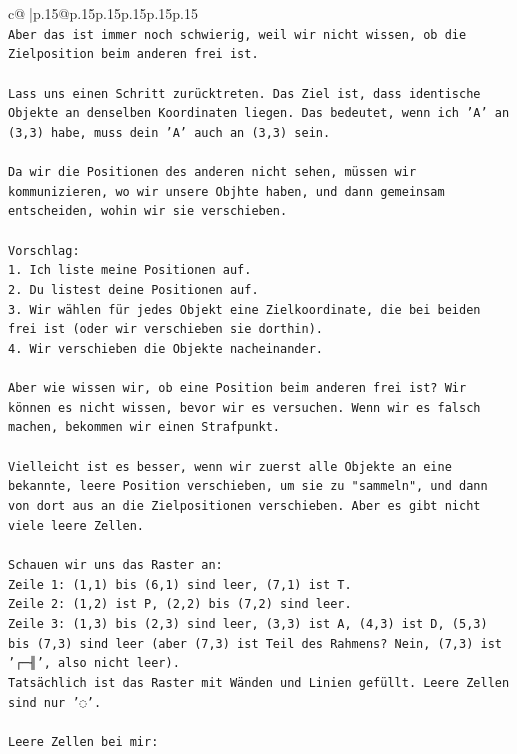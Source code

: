\documentclass{article}
\begin{document}
{\begin{supertabular}{c@{$\;$}|p{.15\linewidth}@{}p{.15\linewidth}p{.15\linewidth}p{.15\linewidth}p{.15\linewidth}p{.15\linewidth}}
{{{\\ 
\texttt{Aber das ist immer noch schwierig, weil wir nicht wissen, ob die Zielposition beim anderen frei ist.} \\
\\ 
\texttt{Lass uns einen Schritt zurücktreten. Das Ziel ist, dass identische Objekte an denselben Koordinaten liegen. Das bedeutet, wenn ich 'A' an (3,3) habe, muss dein 'A' auch an (3,3) sein.} \\
\\ 
\texttt{Da wir die Positionen des anderen nicht sehen, müssen wir kommunizieren, wo wir unsere Objhte haben, und dann gemeinsam entscheiden, wohin wir sie verschieben.} \\
\\ 
\texttt{Vorschlag:} \\
\texttt{1. Ich liste meine Positionen auf.} \\
\texttt{2. Du listest deine Positionen auf.} \\
\texttt{3. Wir wählen für jedes Objekt eine Zielkoordinate, die bei beiden frei ist (oder wir verschieben sie dorthin).} \\
\texttt{4. Wir verschieben die Objekte nacheinander.} \\
\\ 
\texttt{Aber wie wissen wir, ob eine Position beim anderen frei ist? Wir können es nicht wissen, bevor wir es versuchen. Wenn wir es falsch machen, bekommen wir einen Strafpunkt.} \\
\\ 
\texttt{Vielleicht ist es besser, wenn wir zuerst alle Objekte an eine bekannte, leere Position verschieben, um sie zu "sammeln", und dann von dort aus an die Zielpositionen verschieben. Aber es gibt nicht viele leere Zellen.} \\
\\ 
\texttt{Schauen wir uns das Raster an:} \\
\texttt{Zeile 1: (1,1) bis (6,1) sind leer, (7,1) ist T.} \\
\texttt{Zeile 2: (1,2) ist P, (2,2) bis (7,2) sind leer.} \\
\texttt{Zeile 3: (1,3) bis (2,3) sind leer, (3,3) ist A, (4,3) ist D, (5,3) bis (7,3) sind leer (aber (7,3) ist Teil des Rahmens? Nein, (7,3) ist '┌─╢', also nicht leer).} \\
\texttt{Tatsächlich ist das Raster mit Wänden und Linien gefüllt. Leere Zellen sind nur '◌'.} \\
\\ 
\texttt{Leere Zellen bei mir:} \\
}}}
\end{supertabular}}
\end{document}
